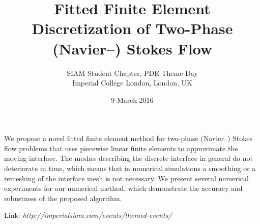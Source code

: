 \documentclass{article}
\begin{document}
\title{Fitted Finite Element Discretization of Two-Phase (Navier--) Stokes
Flow}
\date{9 March 2016}
\author{SIAM Student Chapter, PDE Theme Day\\
Imperial College London, London, UK}

\maketitle

We propose a novel fitted finite element method for two-phase (Navier--) Stokes
flow problems that uses piecewise linear finite elements to approximate the
moving interface. The meshes describing the discrete interface in general do not
deteriorate in time, which means that in numerical simulations a smoothing or a
remeshing of the interface mesh is not necessary. We present several numerical
experiments for our numerical method, which demonstrate the accuracy and
robustness of the proposed algorithm.

Link: \emph{http://imperialsiam.com/events/themed-events/}
\end{document}
